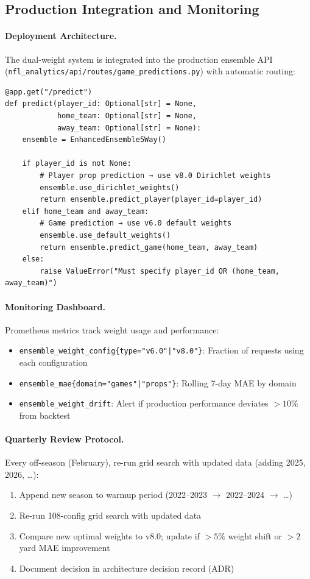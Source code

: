 \subsection{Production Integration and Monitoring}
\label{subsec:production-integration}

\paragraph{Deployment Architecture.}
The dual-weight system is integrated into the production ensemble API (\texttt{nfl\_analytics/api/routes/game\_predictions.py}) with automatic routing:
\begin{verbatim}
@app.get("/predict")
def predict(player_id: Optional[str] = None,
            home_team: Optional[str] = None,
            away_team: Optional[str] = None):
    ensemble = EnhancedEnsemble5Way()

    if player_id is not None:
        # Player prop prediction → use v8.0 Dirichlet weights
        ensemble.use_dirichlet_weights()
        return ensemble.predict_player(player_id=player_id)
    elif home_team and away_team:
        # Game prediction → use v6.0 default weights
        ensemble.use_default_weights()
        return ensemble.predict_game(home_team, away_team)
    else:
        raise ValueError("Must specify player_id OR (home_team, away_team)")
\end{verbatim}

\paragraph{Monitoring Dashboard.}
Prometheus metrics track weight usage and performance:
\begin{itemize}
\item \texttt{ensemble\_weight\_config\{type="v6.0"|"v8.0"\}}: Fraction of requests using each configuration
\item \texttt{ensemble\_mae\{domain="games"|"props"\}}: Rolling 7-day MAE by domain
\item \texttt{ensemble\_weight\_drift}: Alert if production performance deviates $>10\%$ from backtest
\end{itemize}

\paragraph{Quarterly Review Protocol.}
Every off-season (February), re-run grid search with updated data (adding 2025, 2026, \ldots):
\begin{enumerate}
\item Append new season to warmup period (2022--2023 $\to$ 2022--2024 $\to$ \ldots)
\item Re-run 108-config grid search with updated data
\item Compare new optimal weights to v8.0; update if $>5\%$ weight shift or $>2$ yard MAE improvement
\item Document decision in architecture decision record (ADR)
\end{enumerate}


